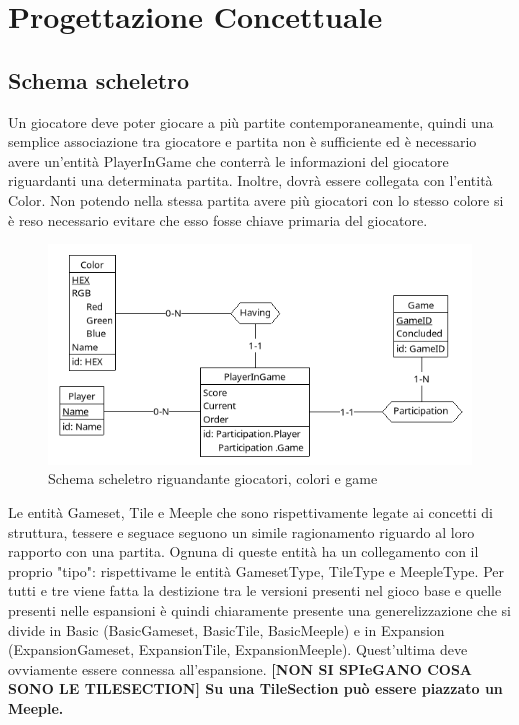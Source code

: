 \section{Progettazione Concettuale}
\subsection{Schema scheletro}
Un giocatore deve poter giocare a più partite contemporaneamente, quindi una semplice associazione tra giocatore e partita non è sufficiente ed è necessario avere un'entità PlayerInGame che conterrà le informazioni del giocatore riguardanti una determinata partita. Inoltre, dovrà essere collegata con l'entità Color. Non potendo nella stessa partita avere più giocatori con lo stesso colore si è reso necessario evitare che esso fosse chiave primaria del giocatore.

\begin{figure}[ht]
    \centering\includegraphics[scale=0.47]{images/Progettazione/Concettuale/Scheletro1.png}
    \caption{Schema scheletro riguandante giocatori, colori e game}
\end{figure}

Le entità Gameset, Tile e Meeple che sono rispettivamente legate ai concetti di struttura, tessere e seguace seguono un simile ragionamento riguardo al loro rapporto con una partita. Ognuna di queste entità ha un collegamento con il proprio "tipo": rispettivame le entità GamesetType, TileType e MeepleType. Per tutti e tre viene fatta la destizione tra le versioni presenti nel gioco base e quelle presenti nelle espansioni è quindi chiaramente presente una generelizzazione che si divide in Basic (BasicGameset, BasicTile, BasicMeeple) e in Expansion (ExpansionGameset, ExpansionTile, ExpansionMeeple). Quest'ultima deve ovviamente essere connessa all'espansione. \textbf{[NON SI SPIeGANO COSA SONO LE TILESECTION] Su una TileSection può essere piazzato un Meeple.}
\clearpage

